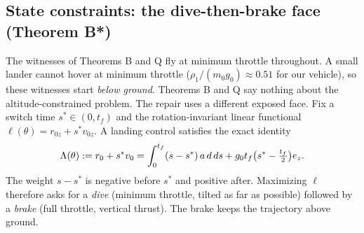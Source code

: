 \subsection{State constraints: the dive-then-brake face (Theorem B*)}\label{sec:Bstar}
The witnesses of Theorems B and Q fly at minimum throttle throughout. A small lander cannot hover at minimum throttle
($\rho_1/(m_0g_0)\approx0.51$ for our vehicle), so these witnesses start \emph{below ground}. Theorems B and Q say
nothing about the altitude-constrained problem. The repair uses a different exposed face. Fix a switch time
$s^*\in(0,t_f)$ and the rotation-invariant linear functional $\ell(\theta)=r_{0z}+s^*v_{0z}$. A landing control
satisfies the exact identity
\begin{equation}\label{eq:lambda}
\Lambda(\theta):=r_0+s^*v_0=\int_0^{t_f}(s-s^*)\,a\,d\,ds+g_0t_f\big(s^*-\tfrac{t_f}2\big)e_z .
\end{equation}
The weight $s-s^*$ is negative before $s^*$ and positive after. Maximizing $\ell$ therefore asks for a \emph{dive}
(minimum throttle, tilted as far as possible) followed by a \emph{brake} (full throttle, vertical thrust). The brake keeps
the trajectory above ground.

